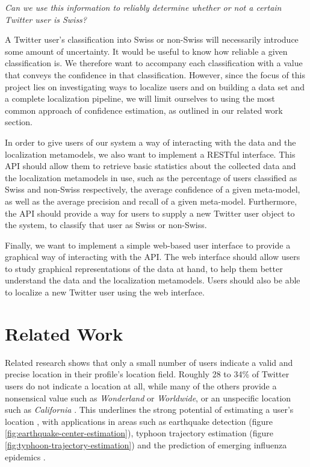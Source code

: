 \documentclass[10pt,a4paper]{article}
\begin{document}
\begin{tcolorbox}[width=\textwidth,colback={white},title={RQ},arc=0mm,outer arc=0mm,colupper=black]    
    \textit{Can we use this information to reliably determine whether or not a certain Twitter user is Swiss?}    
\end{tcolorbox}  

A Twitter user's classification into Swiss or non-Swiss will necessarily introduce some amount of uncertainty. It would be useful to know how reliable a given classification is. We therefore want to accompany each classification with a value that conveys the confidence in that classification. However, since the focus of this project lies on investigating ways to localize users and on building a data set and a complete localization pipeline, we will limit ourselves to using the most common approach of confidence estimation, as outlined in our related work section.

In order to give users of our system a way of interacting with the data and the localization metamodels, we also want to implement a RESTful interface. This API should allow them to retrieve basic statistics about the collected data and the localization metamodels in use, such as the percentage of users classified as Swiss and non-Swiss respectively, the average confidence of a given meta-model, as well as the average precision and recall of a given meta-model. Furthermore, the API should provide a way for users to supply a new Twitter user object to the system, to classify that user as Swiss or non-Swiss. 

Finally, we want to implement a simple web-based user interface to provide a graphical way of interacting with the API. The web interface should allow users to study graphical representations of the data at hand, to help them better understand the data and the localization metamodels. Users should also be able to localize a new Twitter user using the web interface.

\section{Related Work}
Related research shows that only a small number of users indicate a valid and precise location in their profile's location field. Roughly 28 to 34\% of Twitter users do not indicate a location at all, while many of the others provide a nonsensical value such as \textit{Wonderland} or \textit{Worldwide}, or an unspecific location such as \textit{California} \cite{chen10a, hech11a}. This underlines the strong potential of estimating a user's location \cite{chen10a}, with applications in areas such as earthquake detection \cite{robi11a, saka10a} (figure \ref{fig:earthquake-center-estimation}), typhoon trajectory estimation \cite{saka10a} (figure \ref{fig:typhoon-trajectory-estimation}) and the prediction of emerging influenza epidemics \cite{achr11a}.
\end{document}
